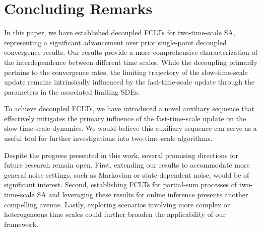 \documentclass[11pt]{article}
\theoremstyle{plain}
\theoremstyle{definition}
\begin{document}
\section{Concluding Remarks}\label{sec:fclt:conclude}

In this paper, we have established decoupled FCLTs for two-time-scale SA, representing a significant advancement over prior single-point decoupled convergence results. Our results provide a more comprehensive characterization of the interdependence between different time scales. While the decoupling primarily pertains to the convergence rates, the limiting trajectory of the slow-time-scale update remains intrinsically influenced by the fast-time-scale update through the parameters in the associated limiting SDEs.

To achieve decoupled FCLTs, we have introduced a novel auxiliary sequence that effectively mitigates the primary influence of the fast-time-scale update on the slow-time-scale dynamics. We would believe this auxiliary sequence can serve as a useful tool for further investigations into two-time-scale algorithms.

Despite the progress presented in this work, several promising directions for future research remain open. First, extending our results to accommodate more general noise settings, such as Markovian or state-dependent noise, would be of significant interest. Second, establishing FCLTs for partial-sum processes of two-time-scale SA and leveraging these results for online inference presents another compelling avenue. Lastly, exploring scenarios involving more complex or heterogeneous time scales could further broaden the applicability of our framework.








\end{document}

